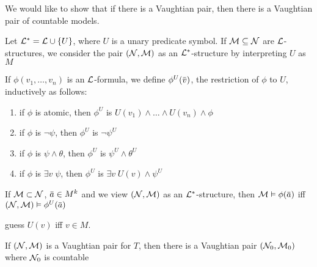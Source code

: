 \documentclass[11pt]{article}
\begin{document}
We would like to show that if there is a Vaughtian pair, then there is a Vaughtian pair of
countable models.

Let \(\mathcal{L}^*=\mathcal{L}\cup\{U\}\), where \(U\) is a unary predicate symbol. If \(\mathcal{M}\subseteq\mathcal{N}\) are \(\mathcal{L}\)-structures, we
consider the pair \((\mathcal{N},\mathcal{M})\) as an \(\mathcal{L}^*\)-structure by interpreting \(U\) as \(M\)

If \(\phi(v_1,\dots,v_n)\) is an \(\mathcal{L}\)-formula, we define \(\phi^U(\barv)\), the restriction of \(\phi\) to \(U\),
inductively as follows:
\begin{enumerate}
\item if \(\phi\) is atomic, then \(\phi^U\) is \(U(v_1)\wedge\dots\wedge U(v_n)\wedge\phi\)
\item if \(\phi\) is \(\neg\psi\), then \(\phi^U\) is \(\neg\psi^U\)
\item if \(\phi\) is \(\psi\wedge\theta\), then \(\phi^U\) is \(\psi^U\wedge\theta^U\)
\item if \(\phi\) is \(\exists v\;\psi\), then \(\phi^U\) is \(\exists v\;U(v)\wedge\psi^U\)
\end{enumerate}


If \(\mathcal{M}\subset\mathcal{N}\), \(\bara\in M^k\) and we view \((\mathcal{N},\mathcal{M})\) as an \(\mathcal{L}^*\)-structure, then \(\calm\vDash\phi(\bara)\)
iff \((\caln,\calm)\vDash\phi^U(\bara)\)

guess \(U(v)\) iff \(v\in M\).

\begin{lemma}[]
If \((\mathcal{N},\mathcal{M})\) is a Vaughtian pair for \(T\), then there is a Vaughtian pair \((\mathcal{N}_0,\mathcal{M}_0)\)
where \(\mathcal{N}_0\) is countable
\end{lemma}
\end{document}
